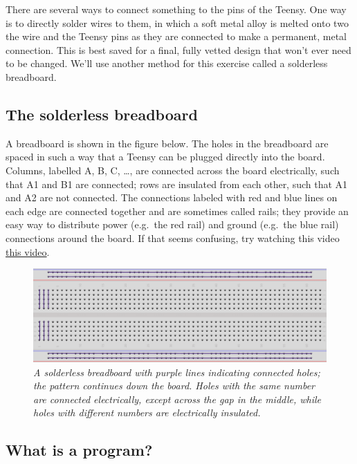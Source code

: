 \documentclass[]{book}
\begin{document}
There are several ways to connect something to the pins of the Teensy. One way is to directly solder wires to them, in which a soft metal alloy is melted onto two the wire and the Teensy pins as they are connected to make a permanent, metal connection. This is best saved for a final, fully vetted design that won't ever need to be changed. We'll use another method for this exercise called a solderless breadboard.

\hypertarget{the-solderless-breadboard}{%
\subsection*{The solderless breadboard}\label{the-solderless-breadboard}}

A breadboard is shown in the figure below. The holes in the breadboard are spaced in such a way that a Teensy can be plugged directly into the board. Columns, labelled A, B, C, \ldots, are connected across the board electrically, such that A1 and B1 are connected; rows are insulated from each other, such that A1 and A2 are not connected. The connections labeled with red and blue lines on each edge are connected together and are sometimes called rails; they provide an easy way to distribute power (e.g.~the red rail) and ground (e.g.~the blue rail) connections around the board. If that seems confusing, try watching this video \href{https://www.youtube.com/watch?v=mLOxoK1zj9A}{this video}.

\begin{figure}
\centering
\includegraphics{images/breadboard.png}
\caption{\emph{A solderless breadboard with purple lines indicating connected holes; the pattern continues down the board. Holes with the same number are connected electrically, except across the gap in the middle, while holes with different numbers are electrically insulated.}}
\end{figure}

\hypertarget{what-is-a-program}{%
\subsection*{What is a program?}\label{what-is-a-program}}
\end{document}
